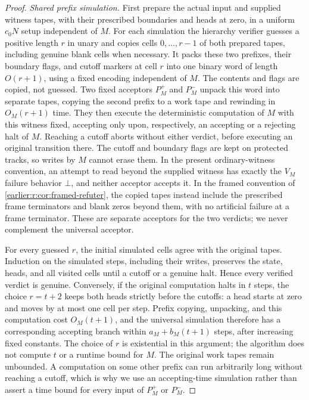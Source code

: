 \begin{proof}
\emph{Shared prefix simulation.} First prepare the actual input and
supplied witness tapes, with their prescribed boundaries and heads at
zero, in a uniform \(c_0N\) setup independent of \(M\). For each
simulation the hierarchy verifier guesses a positive length \(r\) in
unary and copies cells \(0,\ldots,r-1\) of both prepared tapes,
including genuine blank cells when necessary. It packs these two
prefixes, their boundary flags, and cutoff markers at cell \(r\)
into one binary word of length \(O(r+1)\), using a fixed encoding
independent of \(M\). The contents and flags are copied, not guessed.
Two fixed acceptors \(P_M^+\) and \(P_M^-\) unpack this word into
separate tapes, copying the second prefix to a work tape and rewinding
in \(O_M(r+1)\) time. They then execute the deterministic computation
of \(M\) with this witness fixed, accepting only upon, respectively,
an accepting or a rejecting halt of \(M\). Reaching a cutoff aborts
without either verdict, before executing an original transition there.
The cutoff and boundary flags are kept on protected tracks, so writes
by \(M\) cannot erase them. In the present ordinary-witness convention,
an attempt to read beyond the supplied witness has exactly the
\(V_M\) failure behavior \(\bot\), and neither acceptor accepts it.
In the framed convention of \cref{earlier:r:cor:framed-refuter}, the copied
tapes instead include the prescribed frame terminators and blank
zeros beyond them, with no artificial failure at a frame terminator.
These are separate acceptors for the two verdicts; we never complement
the universal acceptor.

For every guessed \(r\), the initial simulated cells agree with the
original tapes. Induction on the simulated steps, including their
writes, preserves the state, heads, and all visited cells until a
cutoff or a genuine halt. Hence every verified verdict is genuine.
Conversely, if the original computation halts in \(t\) steps, the
choice \(r=t+2\) keeps both heads strictly before the cutoffs: a head
starts at zero and moves by at most one cell per step. Prefix copying,
unpacking, and this computation cost \(O_M(t+1)\), and the universal
simulation therefore has a corresponding accepting branch within
\(a_M+b_M(t+1)\) steps, after increasing fixed constants. The choice
of \(r\) is existential in this argument; the algorithm does not
compute \(t\) or a runtime bound for \(M\). The original work tapes
remain unbounded. A computation on some other prefix can run
arbitrarily long without reaching a cutoff, which is why we use an
accepting-time simulation rather than assert a time bound for every
input of \(P_M^+\) or \(P_M^-\).


\end{proof}
